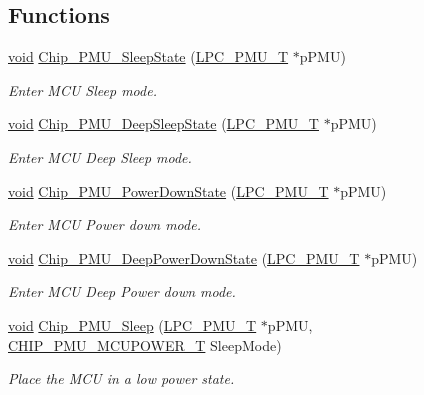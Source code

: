 \subsection*{Functions}
\begin{DoxyCompactItemize}
\item 
\hyperlink{Paradigm_2Tern__EE_2small_2portmacro_8h_a14d32f8130d3c0b212cfc751730b5b49}{void} \hyperlink{group__PMU__17XX__40XX_ga8b2198dfa41da8da19c47a3b7d51283a}{Chip\-\_\-\-P\-M\-U\-\_\-\-Sleep\-State} (\hyperlink{structLPC__PMU__T}{L\-P\-C\-\_\-\-P\-M\-U\-\_\-\-T} $\ast$p\-P\-M\-U)
\begin{DoxyCompactList}\small\item\em Enter M\-C\-U Sleep mode. \end{DoxyCompactList}\item 
\hyperlink{Paradigm_2Tern__EE_2small_2portmacro_8h_a14d32f8130d3c0b212cfc751730b5b49}{void} \hyperlink{group__PMU__17XX__40XX_gaf45cdc5409ccf675212a077341e80506}{Chip\-\_\-\-P\-M\-U\-\_\-\-Deep\-Sleep\-State} (\hyperlink{structLPC__PMU__T}{L\-P\-C\-\_\-\-P\-M\-U\-\_\-\-T} $\ast$p\-P\-M\-U)
\begin{DoxyCompactList}\small\item\em Enter M\-C\-U Deep Sleep mode. \end{DoxyCompactList}\item 
\hyperlink{Paradigm_2Tern__EE_2small_2portmacro_8h_a14d32f8130d3c0b212cfc751730b5b49}{void} \hyperlink{group__PMU__17XX__40XX_gaa99405714fbc2707643ea8dd36895a26}{Chip\-\_\-\-P\-M\-U\-\_\-\-Power\-Down\-State} (\hyperlink{structLPC__PMU__T}{L\-P\-C\-\_\-\-P\-M\-U\-\_\-\-T} $\ast$p\-P\-M\-U)
\begin{DoxyCompactList}\small\item\em Enter M\-C\-U Power down mode. \end{DoxyCompactList}\item 
\hyperlink{Paradigm_2Tern__EE_2small_2portmacro_8h_a14d32f8130d3c0b212cfc751730b5b49}{void} \hyperlink{group__PMU__17XX__40XX_gad145abba9dc403d8db57c6b328f8d0c4}{Chip\-\_\-\-P\-M\-U\-\_\-\-Deep\-Power\-Down\-State} (\hyperlink{structLPC__PMU__T}{L\-P\-C\-\_\-\-P\-M\-U\-\_\-\-T} $\ast$p\-P\-M\-U)
\begin{DoxyCompactList}\small\item\em Enter M\-C\-U Deep Power down mode. \end{DoxyCompactList}\item 
\hyperlink{Paradigm_2Tern__EE_2small_2portmacro_8h_a14d32f8130d3c0b212cfc751730b5b49}{void} \hyperlink{group__PMU__17XX__40XX_gaca883204092fcbc6e4705a3461029220}{Chip\-\_\-\-P\-M\-U\-\_\-\-Sleep} (\hyperlink{structLPC__PMU__T}{L\-P\-C\-\_\-\-P\-M\-U\-\_\-\-T} $\ast$p\-P\-M\-U, \hyperlink{group__PMU__17XX__40XX_ga724dd269fe2bbc43740331f35c3bf463}{C\-H\-I\-P\-\_\-\-P\-M\-U\-\_\-\-M\-C\-U\-P\-O\-W\-E\-R\-\_\-\-T} Sleep\-Mode)
\begin{DoxyCompactList}\small\item\em Place the M\-C\-U in a low power state. \end{DoxyCompactList}\end{DoxyCompactItemize}


